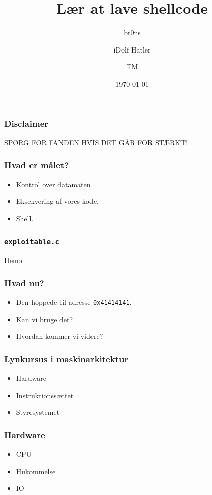 \documentclass[slidestop,compress,mathserif, xcolor=table]{beamer}
\title[]{Lær at lave shellcode}
\author[br0ns \and iDolf Hatler \and TM]
       {br0ns \and iDolf Hatler \and TM}
\institute[DIKU]{Datalogisk institut, Københavns universitet}
\date[]{\today}
\begin{document}
\frame[plain]{\titlepage}

\begin{frame}[c]
    \frametitle{Disclaimer}

    SPØRG FOR FANDEN HVIS DET GÅR FOR STÆRKT!
\end{frame}

\begin{frame}[c]
    \frametitle{Hvad er målet?}

    \begin{itemize}
        \pause\item Kontrol over datamaten.
        \pause\item Eksekvering af vores kode.
        \pause\item Shell.
    \end{itemize}
\end{frame}

\begin{frame}[c]
    \frametitle{\texttt{exploitable.c}}

    
\end{frame}

\begin{frame}[c]
    \begin{center}
      \Huge Demo
    \end{center}
  \end{frame}

\begin{frame}[c]
    \frametitle{Hvad nu?}

    \begin{itemize}
        \pause\item Den hoppede til adresse \texttt{0x41414141}.
        \pause\item Kan vi bruge det?
        \pause\item Hvordan kommer vi videre?
    \end{itemize}
\end{frame}

\begin{frame}[c]
  \frametitle{Lynkursus i maskinarkitektur}
  \begin{itemize}
    \pause\item Hardware
    \pause\item Instruktionssættet
    \pause\item Styresystemet
  \end{itemize}
\end{frame}

\begin{frame}[c]
    \frametitle{Hardware}
    \begin{itemize}
        \pause\item CPU
        \pause\item Hukommelse
        \pause\item IO
    \end{itemize}
\end{frame}
\end{document}
